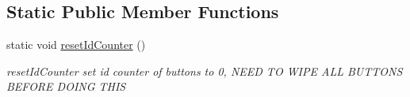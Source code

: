 \subsection*{Static Public Member Functions}
\begin{DoxyCompactItemize}
\item 
\hypertarget{class_button_a5ba57a0cbdb63e916098035e4e0d9a4a}{}static void \hyperlink{class_button_a5ba57a0cbdb63e916098035e4e0d9a4a}{reset\+Id\+Counter} ()\label{class_button_a5ba57a0cbdb63e916098035e4e0d9a4a}

\begin{DoxyCompactList}\small\item\em reset\+Id\+Counter set id counter of buttons to 0, N\+E\+E\+D T\+O W\+I\+P\+E A\+L\+L B\+U\+T\+T\+O\+N\+S B\+E\+F\+O\+R\+E D\+O\+I\+N\+G T\+H\+I\+S \end{DoxyCompactList}\end{DoxyCompactItemize}
